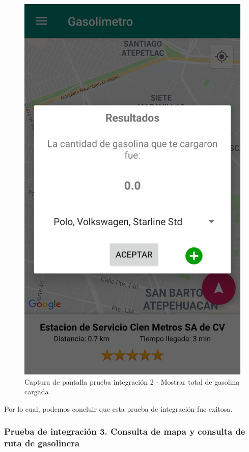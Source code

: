 \begin{figure}[H]
	\centering
	\includegraphics[scale=.2]{Capitulo6/integracion/software/images/10}
	\caption{Captura de pantalla prueba integración 2 - Mostrar total de gasolina cargada}
	\label{fig:int10}
\end{figure}

Por lo cual, podemos concluir que esta prueba de integración fue exitosa.

\subsubsection{Prueba de integración 3. Consulta de mapa y consulta de ruta de gasolinera}

